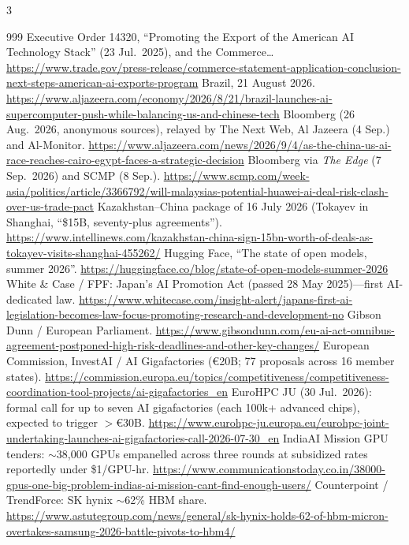 \begin{multicols}{3}
\begin{thebibliography}{999}
 Executive Order 14320, ``Promoting the Export of the American AI Technology Stack'' (23 Jul.\ 2025), and the Commerce… \url{https://www.trade.gov/press-release/commerce-statement-application-conclusion-next-steps-american-ai-exports-program}
 Brazil, 21 August 2026. \url{https://www.aljazeera.com/economy/2026/8/21/brazil-launches-ai-supercomputer-push-while-balancing-us-and-chinese-tech}
 Bloomberg (26 Aug.\ 2026, anonymous sources), relayed by The Next Web, Al Jazeera (4 Sep.) and Al-Monitor. \url{https://www.aljazeera.com/news/2026/9/4/as-the-china-us-ai-race-reaches-cairo-egypt-faces-a-strategic-decision}
 Bloomberg via \emph{The Edge} (7 Sep.\ 2026) and SCMP (8 Sep.). \url{https://www.scmp.com/week-asia/politics/article/3366792/will-malaysias-potential-huawei-ai-deal-risk-clash-over-us-trade-pact}
 Kazakhstan--China package of 16 July 2026 (Tokayev in Shanghai, ``\$15B, seventy-plus agreements''). \url{https://www.intellinews.com/kazakhstan-china-sign-15bn-worth-of-deals-as-tokayev-visits-shanghai-455262/}
 Hugging Face, ``The state of open models, summer 2026''. \url{https://huggingface.co/blog/state-of-open-models-summer-2026}
 White \& Case / FPF: Japan's AI Promotion Act (passed 28 May 2025)---first AI-dedicated law. \url{https://www.whitecase.com/insight-alert/japans-first-ai-legislation-becomes-law-focus-promoting-research-and-development-no}
 Gibson Dunn / European Parliament. \url{https://www.gibsondunn.com/eu-ai-act-omnibus-agreement-postponed-high-risk-deadlines-and-other-key-changes/}
 European Commission, InvestAI / AI Gigafactories (€20B; 77 proposals across 16 member states). \url{https://commission.europa.eu/topics/competitiveness/competitiveness-coordination-tool-projects/ai-gigafactories_en}
 EuroHPC JU (30 Jul.\ 2026): formal call for up to seven AI gigafactories (each 100k+ advanced chips), expected to trigger $>$€30B. \url{https://www.eurohpc-ju.europa.eu/eurohpc-joint-undertaking-launches-ai-gigafactories-call-2026-07-30_en}
 IndiaAI Mission GPU tenders: $\sim$38,000 GPUs empanelled across three rounds at subsidized rates reportedly under \$1/GPU-hr. \url{https://www.communicationstoday.co.in/38000-gpus-one-big-problem-indias-ai-mission-cant-find-enough-users/}
 Counterpoint / TrendForce: SK hynix $\sim$62\% HBM share. \url{https://www.astutegroup.com/news/general/sk-hynix-holds-62-of-hbm-micron-overtakes-samsung-2026-battle-pivots-to-hbm4/}

\end{thebibliography}
\end{multicols}
